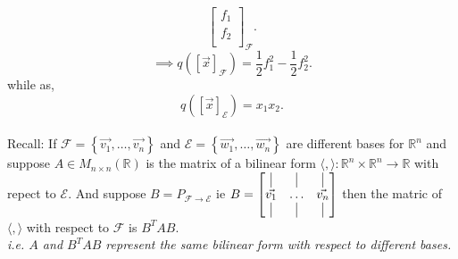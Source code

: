 \documentclass{report}
\begin{document}
{\[\begin{bmatrix}
           f_1\\
           f_2\\
           \end{bmatrix}
           _{ \mathcal{F}}
          .\] 
          \[
           \implies q \left(  \left[ \vec{ x}  \right] _{ \mathcal{F}} \right) = \frac{1}{2} f_1 ^2 - \frac{1}{2} f_2 ^2 
          .\] 
          while as,
          \[
           q \left( \left[ \vec{ x}  \right] _{ \mathcal{E}}\right) = x_1 x_2 
          .\] 
          \\
          Recall: If $ \mathcal{F} = \left\{  \vec{ v_1} , \ldots , \vec{ v_n}  \right\}$ and $  \mathcal{E} = \left\{  \vec{ w_1} , \ldots , \vec{ w_n} \right\} $ are different bases for $ \mathbb{R} ^{n}$ and suppose $ A \in M _{ n \times n}\left( \mathbb{R} \right) $  is the matrix of a bilinear form $ \langle ,  \rangle : \mathbb{R} ^{n} \times \mathbb{R} ^{n} \to \mathbb{R} $ with repect to $ \mathcal{E}$. And suppose $ B = P _{ \mathcal{F}\to \mathcal{E} }$ ie $ B = \begin{bmatrix}
          \vline & \vline & \vline\\
          \vec{ v_1}  & \ldots & \vec{ v_n} \\
          \vline & \vline & \vline\\
          \end{bmatrix}$
          then the matric of $ \langle ,  \rangle $ with respect to $ \mathcal{F}$ is $ B ^{T}A B $.\\
          \textit{ i.e. $ A$ and $ B^{T}A B$ represent the same bilinear form with respect to different bases.}\\
 } 
 
\end{document}
